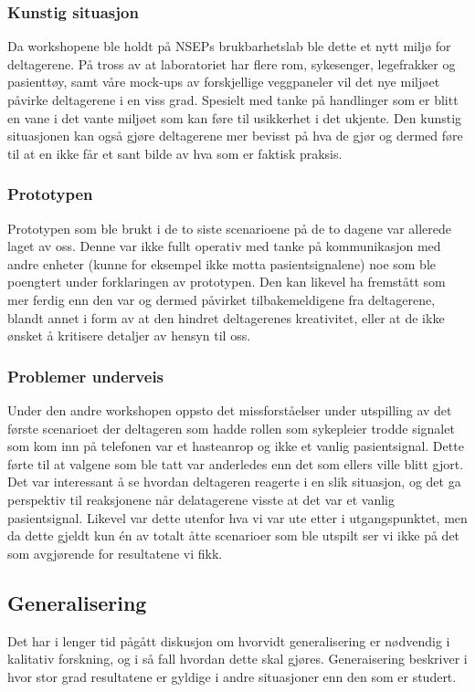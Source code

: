 \subsubsection{Kunstig situasjon}
Da workshopene ble holdt på NSEPs brukbarhetslab ble dette et nytt miljø for deltagerene. På tross av at laboratoriet har flere rom, sykesenger, legefrakker og pasienttøy, samt våre mock-ups av forskjellige veggpaneler vil det nye miljøet påvirke deltagerene i en viss grad. Spesielt med tanke på handlinger som er blitt en vane i det vante miljøet som kan føre til usikkerhet i det ukjente. Den kunstig situasjonen kan også gjøre deltagerene mer bevisst på hva de gjør og dermed føre til at en ikke får et sant bilde av hva som er faktisk praksis. 

\subsubsection{Prototypen}
Prototypen som ble brukt i de to siste scenarioene på de to dagene var allerede laget av oss. Denne var ikke fullt operativ med tanke på kommunikasjon med andre enheter (kunne for eksempel ikke motta pasientsignalene) noe som ble poengtert under forklaringen av prototypen. Den kan likevel ha fremstått som mer ferdig enn den var og dermed påvirket tilbakemeldigene fra deltagerene, blandt annet i form av at den hindret deltagerenes kreativitet, eller at de ikke ønsket å kritisere detaljer av hensyn til oss.

\subsubsection{Problemer underveis}
Under den andre workshopen oppsto det missforståelser under utspilling av det første scenarioet der deltageren som hadde rollen som sykepleier trodde signalet som kom inn på telefonen var et hasteanrop og ikke et vanlig pasientsignal. Dette førte til at valgene som ble tatt var anderledes enn det som ellers ville blitt gjort. Det var interessant å se hvordan deltageren reagerte i en slik situasjon, og det ga perspektiv til reaksjonene når delatagerene visste at det var et vanlig pasientsignal. Likevel var dette utenfor hva vi var ute etter i utgangspunktet, men da dette gjeldt kun én av totalt åtte scenarioer som ble utspilt ser vi ikke på det som avgjørende for resultatene vi fikk. 

\subsection{Generalisering}
Det har i lenger tid pågått diskusjon om hvorvidt generalisering er nødvendig i kalitativ forskning, og i så fall hvordan dette skal gjøres. Generaisering beskriver i hvor stor grad resultatene er gyldige i andre situasjoner enn den som er studert. 
